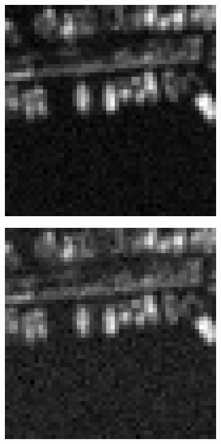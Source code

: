 \begin{figure}[htpb]
\begin{subfigure}{.2\textwidth}
\end{subfigure}%
\begin{subfigure}{.2\textwidth}
\includegraphics[width=\textwidth]{img/image2NoiseLevel3}
\end{subfigure}%
\begin{subfigure}{.2\textwidth}
\includegraphics[width=\textwidth]{img/image2NoiseLevel4}

\end{subfigure}
\end{figure}
